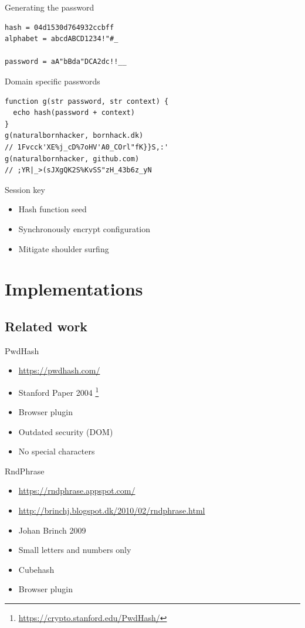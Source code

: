 \documentclass{beamer}
\begin{document}
\begin{frame}[fragile]{Generating the password}
  \begin{verbatim}
hash = 04d1530d764932ccbff
alphabet = abcdABCD1234!"#_

password = aA"bBda"DCA2dc!!__
  \end{verbatim}
\end{frame}

\begin{frame}[fragile]{Domain specific passwords}
  \begin{verbatim}
function g(str password, str context) {
  echo hash(password + context)
}
g(naturalbornhacker, bornhack.dk)
// 1Fvcck'XE%j_cD%7oHV'A0_COrl"fK}}S,:'
g(naturalbornhacker, github.com)
// ;YR|_>(sJXgQK2S%KvSS"zH_43b6z_yN
  \end{verbatim}
\end{frame}

\begin{frame}[fragile]{Session key}
  \begin{itemize}
    \item Hash function seed
    \item Synchronously encrypt configuration
    \item Mitigate shoulder surfing
  \end{itemize}
\end{frame}

\section{Implementations}
\subsection{Related work}
\begin{frame}{PwdHash}
  \begin{itemize}
    \item \url{https://pwdhash.com/}
    \item Stanford Paper 2004 \footnote{\url{https://crypto.stanford.edu/PwdHash/}}
    \item Browser plugin
    \item Outdated security (DOM)
    \item No special characters
  \end{itemize}
\end{frame}

\begin{frame}{RndPhrase}
  \begin{itemize}
    \item \url{https://rndphrase.appspot.com/}
    \item \url{http://brinchj.blogspot.dk/2010/02/rndphrase.html}
    \item Johan Brinch 2009
    \item Small letters and numbers only
    \item Cubehash
    \item Browser plugin
  \end{itemize}
\end{frame}
\end{document}
